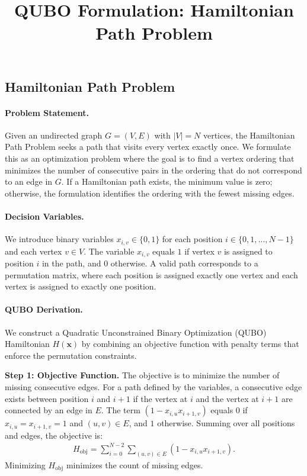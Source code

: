 \documentclass[12pt]{article}
\title{QUBO Formulation: Hamiltonian Path Problem}
\date{}
\begin{document}
\maketitle

\subsection*{Hamiltonian Path Problem}

\paragraph{Problem Statement.}
Given an undirected graph $G=(V,E)$ with $|V|=N$ vertices, the Hamiltonian Path Problem seeks a path that visits every vertex exactly once. We formulate this as an optimization problem where the goal is to find a vertex ordering that minimizes the number of consecutive pairs in the ordering that do not correspond to an edge in $G$. If a Hamiltonian path exists, the minimum value is zero; otherwise, the formulation identifies the ordering with the fewest missing edges.

\paragraph{Decision Variables.}
We introduce binary variables $x_{i,v} \in \{0,1\}$ for each position $i \in \{0, 1, \dots, N-1\}$ and each vertex $v \in V$. The variable $x_{i,v}$ equals $1$ if vertex $v$ is assigned to position $i$ in the path, and $0$ otherwise. A valid path corresponds to a permutation matrix, where each position is assigned exactly one vertex and each vertex is assigned to exactly one position.

\paragraph{QUBO Derivation.}
We construct a Quadratic Unconstrained Binary Optimization (QUBO) Hamiltonian $H(\mathbf{x})$ by combining an objective function with penalty terms that enforce the permutation constraints.

\textbf{Step 1: Objective Function.}
The objective is to minimize the number of missing consecutive edges. For a path defined by the variables, a consecutive edge exists between position $i$ and $i+1$ if the vertex at $i$ and the vertex at $i+1$ are connected by an edge in $E$. The term $(1 - x_{i,u} x_{i+1,v})$ equals $0$ if $x_{i,u}=x_{i+1,v}=1$ and $(u,v) \in E$, and $1$ otherwise. Summing over all positions and edges, the objective is:
\begin{align}
H_{\text{obj}} = \sum_{i=0}^{N-2} \sum_{(u,v) \in E} \left( 1 - x_{i,u} x_{i+1,v} \right).
\end{align}
Minimizing $H_{\text{obj}}$ minimizes the count of missing edges.
\end{document}
